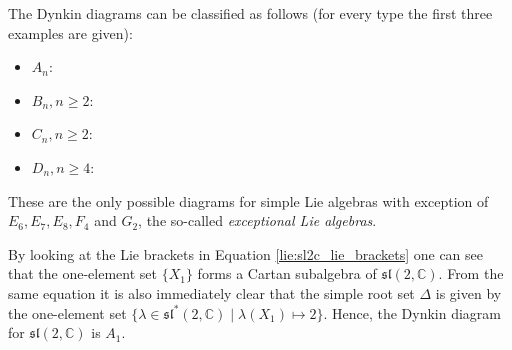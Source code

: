     \begin{property}[Classification]
        The Dynkin diagrams can be classified as follows (for every type the first three examples are given):
        \begin{itemize}
            \item $A_n$: \begin{center}\dynk {}  \end{center}
        \item $B_n,n\geq2$: \begin{center}   \end{center}
        \item $C_n,n\geq2$: \begin{center}   \end{center}
        \item $D_n,n\geq4$: \begin{center}   \end{center}
        \end{itemize}
        These are the only possible diagrams for simple Lie algebras with exception of $E_6,E_7,E_8,F_4$ and $G_2$, the so-called \textit{exceptional Lie algebras}.
    \end{property}

    \begin{example}
        By looking at the Lie brackets in Equation \eqref{lie:sl2c_lie_brackets} one can see that the one-element set $\{X_1\}$ forms a Cartan subalgebra of $\mathfrak{sl}(2,\mathbb{C})$. From the same equation it is also immediately clear that the simple root set $\Delta$ is given by the one-element set $\{\lambda\in\mathfrak{sl}^*(2,\mathbb{C})\mid\lambda(X_1)\mapsto 2\}$. Hence, the Dynkin diagram for $\mathfrak{sl}(2,\mathbb{C})$ is $A_1$.
    \end{example}

